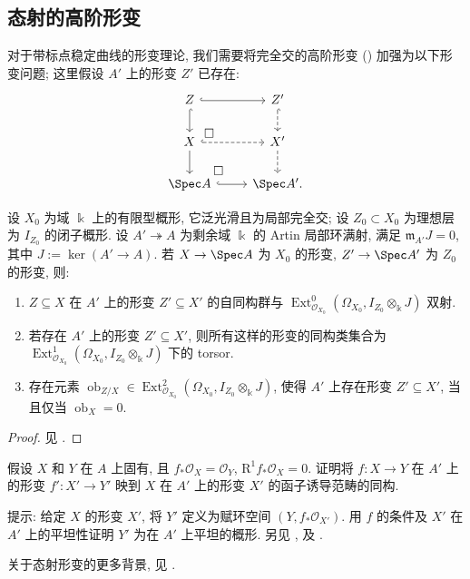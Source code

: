 \subsection{态射的高阶形变}\label{src:C.2.3-subsection}
对于带标点稳定曲线的形变理论, 我们需要将完全交的高阶形变 () 加强为以下形变问题; 这里假设 $A'$ 上的形变 $Z'$ 已存在:
\[
\begin{tikzcd}
Z\arrow[r,hook]\arrow[d,hook]&Z'\arrow[d,hook,dashed]\\
X\arrow[r,hook,dashed]\arrow[d]\arrow[ur,phantom,"\square",very near start]&X'\arrow[d,dashed]\\
\Spec A\arrow[r,hook]\arrow[ur,phantom,"\square",very near start]&\Spec A'.
\end{tikzcd}
\]
\begin{proposition}[固定源的态射的高阶形变]\label{src:C.2.8}
设 $X_0$ 为域 $\Bbbk$ 上的有限型概形, 它泛光滑且为局部完全交; 设 $Z_0\subset X_0$ 为理想层为 $I_{Z_0}$ 的闭子概形. 设 $A'\twoheadrightarrow A$ 为剩余域 $\Bbbk$ 的 Artin 局部环满射, 满足 $\mathfrak m_{A'}J=0$, 其中 $J:=\ker(A'\to A)$. 若 $X\to\Spec A$ 为 $X_0$ 的形变, $Z'\to\Spec A'$ 为 $Z_0$ 的形变, 则:
\begin{enumerate}[(1)]
\item $Z\subseteq X$ 在 $A'$ 上的形变 $Z'\subseteq X'$ 的自同构群与 $\operatorname{Ext}_{\mathcal O_{X_0}}^0(\Omega_{X_0},I_{Z_0}\otimes_{\Bbbk}J)$ 双射.
\item 若存在 $A'$ 上的形变 $Z'\subseteq X'$, 则所有这样的形变的同构类集合为 $\operatorname{Ext}_{\mathcal O_{X_0}}^1(\Omega_{X_0},I_{Z_0}\otimes_{\Bbbk}J)$ 下的 torsor.
\item 存在元素 $\operatorname{ob}_{Z/X}\in\operatorname{Ext}_{\mathcal O_{X_0}}^2(\Omega_{X_0},I_{Z_0}\otimes_{\Bbbk}J)$, 使得 $A'$ 上存在形变 $Z'\subseteq X'$, 当且仅当 $\operatorname{ob}_X=0$.
\end{enumerate}
\end{proposition}
\begin{proof}
见 \cite[定理 $5.4$]{Vis97}.
\end{proof}
\begin{exercise}[态射的高阶形变]\label{src:C.2.9}
假设 $X$ 和 $Y$ 在 $A$ 上固有, 且 $f_*\mathcal O_X=\mathcal O_Y$, $\mathrm R^1f_*\mathcal O_X=0$. 证明将 $f:X\to Y$ 在 $A'$ 上的形变 $f':X'\to Y'$ 映到 $X$ 在 $A'$ 上的形变 $X'$ 的函子诱导范畴的同构.

提示: 给定 $X$ 的形变 $X'$, 将 $Y'$ 定义为赋环空间 $(Y,f_*\mathcal O_{X'})$. 用 $f$ 的条件及 $X'$ 在 $A'$ 上的平坦性证明 $Y'$ 为在 $A'$ 上平坦的概形. 另见 \cite[定理 $3.3$]{Ran89}, \cite[\S $5.3$]{Vak06} 及 \cite[Tag 0E3X]{SP}.
\end{exercise}
关于态射形变的更多背景, 见 \cite[\S $3.4$]{Ser06}.
